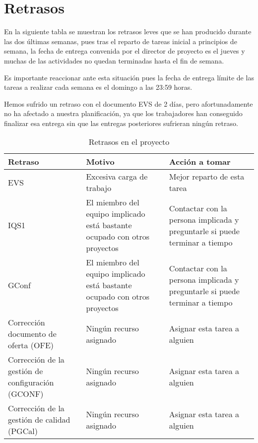 \section{Retrasos}

\par En la siguiente tabla se muestran los retrasos leves que se han producido durante las dos últimas semanas, pues tras el reparto de tareas inicial a principios de semana, la fecha de entrega convenida por el director de proyecto es el jueves y muchas de las actividades no quedan terminadas hasta el fin de semana.
\par Es importante reaccionar ante esta situación pues la fecha de entrega límite de las tareas a realizar cada semana es el domingo a las 23:59 horas.
\par Hemos sufrido un retraso con el documento EVS de 2 días, pero afortunadamente no ha afectado a nuestra planificación, ya que los trabajadores han conseguido finalizar esa entrega sin que las entregas posteriores sufrieran ningún retraso.

\begin{table}[h]
\begin{center}
\begin{tabular}{ p{5cm} p{5cm} p{5cm} }
\hline
	Retraso  & Motivo & Acción a tomar \\ \hline
	EVS & Excesiva carga de trabajo & Mejor reparto de esta tarea \\ \hline
	IQS1 &  El miembro del equipo implicado está bastante ocupado con otros proyectos & Contactar con la persona implicada y preguntarle si puede terminar a tiempo \\ \hline
	GConf & El miembro del equipo implicado está bastante ocupado con otros proyectos  & Contactar con la persona implicada y preguntarle si puede terminar a tiempo \\ \hline
	Corrección documento de oferta (OFE) & Ningún recurso asignado  & Asignar esta tarea a alguien \\ \hline
	Corrección de la gestión de configuración (GCONF) &  Ningún recurso asignado & Asignar esta tarea a alguien \\ \hline
	Corrección de la gestión de calidad (PGCal) & Ningún recurso asignado  & Asignar esta tarea a alguien \\ \hline
\end{tabular}
\caption{Retrasos en el proyecto}
\label{tab:Retrasos en el proyecto2}
\end{center}
\end{table}
